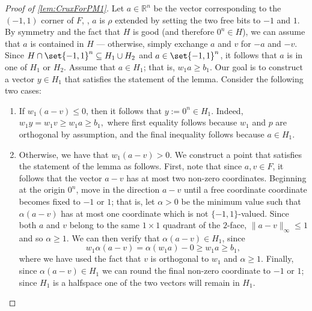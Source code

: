 \begin{proof}[Proof of \autoref{lem:CruxForPM1}]
	Let $a \in \mathbb{R}^n$ be the vector corresponding to the $(-1,1)$ corner of $F$, \ie,  $a$ is $\rho$ extended by setting the two free bits to $-1$ and $1$. By symmetry and the fact that $H$ is good (and therefore $0^n \in H$), we can assume that $a$ is contained in $H$ --- otherwise, simply exchange $a$ and $v$ for $-a$ and $-v$.
	Since $H \cap \set{-1, 1}^n \subseteq H_1 \cup H_2$ and $a \in \set{-1,1}^n$, it follows that $a$ is in one of $H_1$ or $H_2$.  
	Assume that $a \in H_1$; that is, $w_1a \geq b_1$.
	Our goal is to construct a vector $y \in H_1$ that satisfies the statement of the lemma. Consider the following two cases:
	\begin{enumerate}
		\item[(i)] If $w_1( a-v) \leq 0$, then it follows that  $y := 0^n \in H_1$. Indeed,
	$w_1 y = w_1v \geq w_1 a \geq b_1,$
	where first equality follows because $w_1$ and $p$ are orthogonal by assumption, and the final inequality follows because $a \in H_1$. 
		\item[(ii)] Otherwise, we have that $w_1(a-v) > 0$. 
			We construct a point that satisfies the statement of the lemma as follows.
			First, note that since $a, v \in F$, it follows that the vector $a - v$ has at most two non-zero coordinates.
			Beginning at the origin $0^n$, move in the direction $a-v$ until a free coordinate coordinate becomes fixed to $-1$ or $1$; that is, let $\alpha>0$ be the minimum value such that $\alpha(a-v)$ has at most one coordinate which is not $\{-1,1\}$-valued.
			Since both $a$ and $v$ belong to the same $1 \times 1$ quadrant of the $2$-face, $\|a-v\|_{\infty} \leq 1$ and so $\alpha \geq 1$.
			We can then verify that $\alpha(a-v) \in H_1$, since
			\[w_1 \alpha(a-v) = \alpha(w_1a) - 0 \geq w_1a \geq b_1,\]
			where we have used the fact that $v$ is orthogonal to $w_1$ and $\alpha \geq 1$.	
			Finally, since $\alpha(a - v) \in H_1$ we can round the final non-zero coordinate to $-1$ or $1$; since $H_1$ is a halfspace one of the two vectors will remain in $H_1$.    \qedhere  %
	\end{enumerate}
%
\end{proof}





